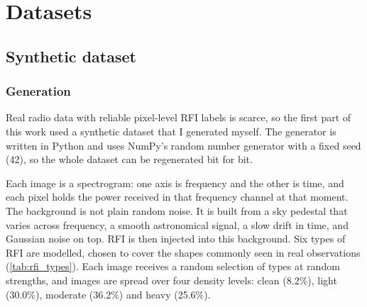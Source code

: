 \chapter{Datasets}
\label{ch:datasets}

\section{Synthetic dataset}
\label{sec:synthetic}

\subsection{Generation}
Real radio data with reliable pixel-level RFI labels is scarce, so the first
part of this work used a synthetic dataset that I generated myself. The
generator is written in Python and uses NumPy's random number generator with a
fixed seed (42), so the whole dataset can be regenerated bit for bit.

Each image is a spectrogram: one axis is frequency and the other is time, and
each pixel holds the power received in that frequency channel at that moment.
The background is not plain random noise. It is built from a sky pedestal that
varies across frequency, a smooth astronomical signal, a slow drift in time,
and Gaussian noise on top. RFI is then injected into this background. Six
types of RFI are modelled, chosen to cover the shapes commonly seen in real
observations (\cref{tab:rfi_types}). Each image receives a random selection of
types at random strengths, and images are spread over four density levels:
clean (8.2\%), light (30.0\%), moderate (36.2\%) and heavy (25.6\%).

